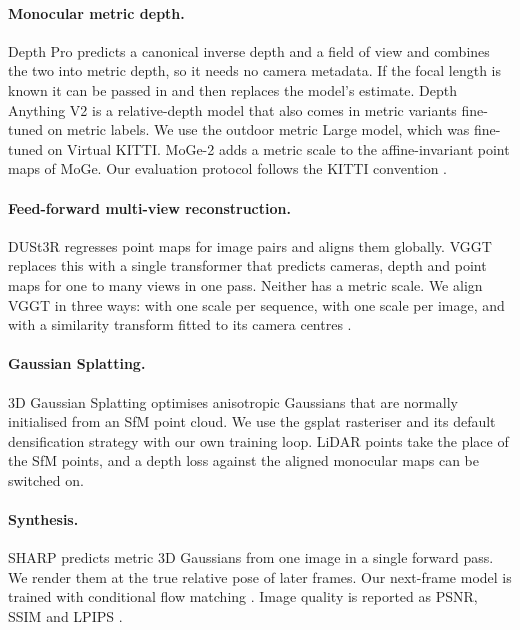 \documentclass[10pt]{article}
\begin{document}
\paragraph{Monocular metric depth.}
Depth Pro \citep{bochkovskii2025depthpro} predicts a canonical inverse depth and a field of view and
combines the two into metric depth, so it needs no camera metadata. If the focal length is known it can be
passed in and then replaces the model's estimate. Depth Anything V2 \citep{yang2024dav2} is a
relative-depth model that also comes in metric variants fine-tuned on metric labels. We use the outdoor
metric Large model, which was fine-tuned on Virtual KITTI. MoGe-2 \citep{wang2025moge2} adds a metric scale
to the affine-invariant point maps of MoGe. Our evaluation protocol follows the KITTI convention
\citep{eigen2014depth,geiger2012kitti}.

\paragraph{Feed-forward multi-view reconstruction.}
DUSt3R \citep{wang2024dust3r} regresses point maps for image pairs and aligns them globally. VGGT
\citep{wang2025vggt} replaces this with a single transformer that predicts cameras, depth and point maps
for one to many views in one pass. Neither has a metric scale. We align VGGT in three ways: with one scale
per sequence, with one scale per image, and with a similarity transform fitted to its camera centres
\citep{umeyama1991}.

\paragraph{Gaussian Splatting.}
3D Gaussian Splatting \citep{kerbl2023gs} optimises anisotropic Gaussians that are normally initialised
from an SfM point cloud. We use the gsplat rasteriser and its default densification strategy
\citep{ye2025gsplat} with our own training loop. LiDAR points take the place of the SfM points, and a depth
loss against the aligned monocular maps can be switched on.

\paragraph{Synthesis.}
SHARP \citep{mescheder2025sharp} predicts metric 3D Gaussians from one image in a single forward pass. We
render them at the true relative pose of later frames. Our next-frame model is trained with conditional
flow matching \citep{lipman2023flow}. Image quality is reported as PSNR, SSIM \citep{wang2004ssim} and
LPIPS \citep{zhang2018lpips}.
\end{document}
